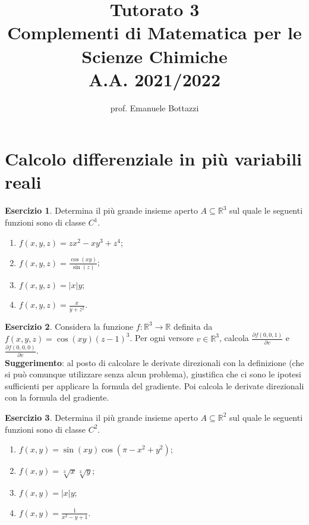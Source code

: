 \documentclass[12pt,a4paper]{article}
\title{Tutorato 3\\Complementi di Matematica per le Scienze Chimiche\\ A.A. 2021/2022}
\author{prof. Emanuele Bottazzi}
\date{}
\theoremstyle{definition}
\newtheorem{exe}{Esercizio}
\begin{document}
\maketitle

\section*{Calcolo differenziale in più variabili reali}

\begin{exe}
    Determina il più grande insieme aperto $A \subseteq \mathbb{R}^3$ sul quale le seguenti funzioni sono di classe $C^1$.
    \begin{enumerate}
        \item $f(x,y,z) = zx^2 - xy^3 + z^4$;
        \item $f(x,y,z) = \frac{\cos(xy)}{\sin(z)}$;
        \item $f(x,y,z) = |x|y$;
        \item $f(x,y,z) = \frac{x}{y+z^2}$.
    \end{enumerate}
\end{exe}

\begin{exe}
    Considera la funzione $f: \mathbb{R}^3 \to \mathbb{R}$ definita da $f(x,y,z) = \cos(xy)(z-1)^3$. Per ogni versore $v \in \mathbb{R}^3$, calcola $\frac{\partial f(0,0,1)}{\partial v}$ e $\frac{\partial f(0,0,0)}{\partial v}$.\\
    \textbf{Suggerimento}: al posto di calcolare le derivate direzionali con la definizione (che si può comunque utilizzare senza alcun problema), giustifica che ci sono le ipotesi sufficienti per applicare la formula del gradiente. Poi calcola le derivate direzionali con la formula del gradiente.
\end{exe}

\begin{exe}
    Determina il più grande insieme aperto $A \subseteq \mathbb{R}^2$ sul quale le seguenti funzioni sono di classe $C^2$.
    \begin{enumerate}
        \item $f(x,y) = \sin(xy)\cos(\pi - x^2 + y^2)$;
        \item $f(x,y) = \sqrt[3]{x} \sqrt[3]{y}$;
        \item $f(x,y) = |x|y$;
        \item $f(x,y) = \frac{1}{x^2 - y + 1}$.
    \end{enumerate}
\end{exe}
\end{document}
